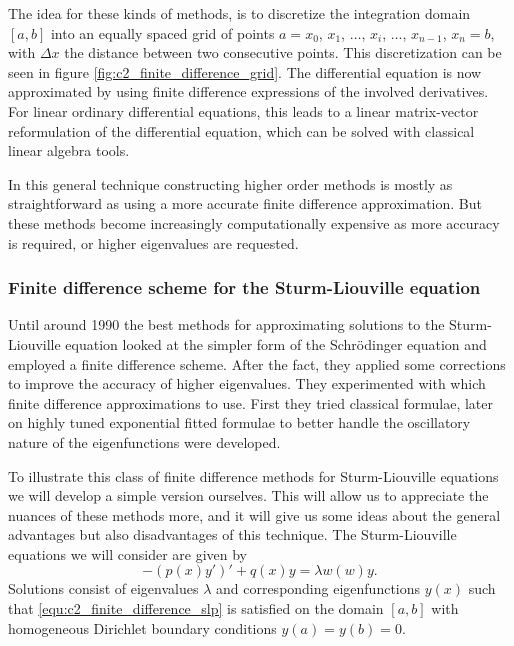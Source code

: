The idea for these kinds of methods, is to discretize the integration domain $[a, b]$ into an equally spaced grid of points $a = x_0$, $x_1$, $\dots$, $x_i$, $\dots$, $x_{n-1}$, $x_{n} = b$, with $\Delta x$ the distance between two consecutive points. This discretization can be seen in figure \ref{fig:c2_finite_difference_grid}. The differential equation is now approximated by using finite difference expressions of the involved derivatives. For linear ordinary differential equations, this leads to a linear matrix-vector reformulation of the differential equation, which can be solved with classical linear algebra tools.

In this general technique constructing higher order methods is mostly as straightforward as using a more accurate finite difference approximation. But these methods become increasingly computationally expensive as more accuracy is required, or higher eigenvalues are requested.


\subsubsection{Finite difference scheme for the Sturm-Liouville equation}

Until around 1990 the best methods \cite{andrew_correction_1985,vandenberghe_accurate_1991} for approximating solutions to the Sturm-Liouville equation looked at the simpler form of the Schrödinger equation and employed a finite difference scheme. After the fact, they applied some corrections to improve the accuracy of higher eigenvalues. They experimented with which finite difference approximations to use. First they tried classical formulae, later on highly tuned exponential fitted formulae to better handle the oscillatory nature of the eigenfunctions were developed.

To illustrate this class of finite difference methods for Sturm-Liouville equations we will develop a simple version ourselves. This will allow us to appreciate the nuances of these methods more, and it will give us some ideas about the general advantages but also disadvantages of this technique. The Sturm-Liouville equations we will consider are given by
\begin{equation}\label{equ:c2_finite_difference_slp}
    -(p(x)y')' + q(x) y = \lambda w(w) y\text{.}
\end{equation}
Solutions consist of eigenvalues $\lambda$ and corresponding eigenfunctions $y(x)$ such that \eqref{equ:c2_finite_difference_slp} is satisfied on the domain $[a, b]$ with homogeneous Dirichlet boundary conditions $y(a) = y(b) = 0$.

